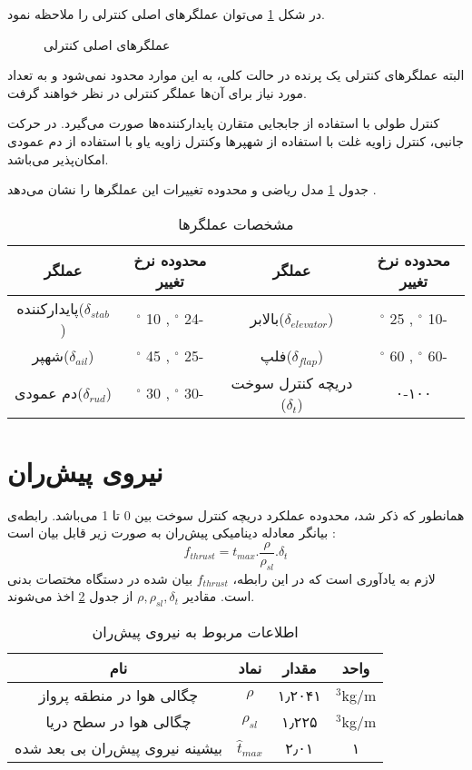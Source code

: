 در شکل \ref{pic:actuators} می‌توان عملگرهای اصلی کنترلی را ملاحظه نمود.
\begin{figure}[t]
\centering 
{}
\caption{عملگرهای اصلی کنترلی}
\label{pic:actuators} %
\end{figure}
البته عملگرهای کنترلی یک پرنده در حالت کلی، به این موارد محدود نمی‌شود و به تعداد مورد نیاز برای آن‌ها عملگر کنترلی در نظر خواهند گرفت.

کنترل طولی با استفاده از جابجایی متقارن پایدارکننده‌ها صورت می‌گیرد.
در حرکت جانبی، کنترل زاویه غلت با استفاده از شهپرها وکنترل زاویه یاو با استفاده از دم عمودی امکان‌پذیر می‌باشد.

جدول \ref{مشخصات عملگرها} مدل ریاضی و محدوده تغییرات این عملگرها را نشان می‌دهد
\cite{Khalighi2016xepersian}
.
\begin{table}
\centering%
\caption{مشخصات عملگرها}\label{مشخصات عملگرها}
\begin{tabular}{|c|c|c|c| }
  \hline  
  عملگر&محدوده نرخ تغییر& عملگر & محدوده نرخ تغییر\\
  \hline
  پایدارکننده($\delta_{stab}$)&$^{\circ}$ 10 , $^{\circ}$ 24-& بالابر($\delta_{elevator}$) &  $^{\circ}$ 25 , $^{\circ}$ 10-\\
  \hline
  شهپر($\delta_{ail}$)&$^{\circ}$ 45 , $^{\circ}$ 25- & فلپ($\delta_{flap}$) & $^{\circ}$ 60 , $^{\circ}$ 60- \\
  \hline
  دم عمودی($\delta_{rud}$)& $^{\circ}$ 30 , $^{\circ}$ 30- & دریچه کنترل سوخت ($\delta_t$)& ۰-۱۰۰\\
  \hline
\end{tabular}
\end{table}
\section{نیروی پیش‌ران }
همانطور که ذکر شد، محدوده عملکرد دریچه کنترل سوخت بین 0 تا 1 می‌باشد.
رابطه‌ی بیانگر معادله دینامیکی پیش‌ران به صورت زیر قابل بیان است
\cite{Khalighi2015xepersian}
:
\begin{equation}
f_{thrust}=t_{max}.\dfrac{\rho}{\rho_{sl}}.\delta_t
\end{equation}
لازم به یادآوری است که در این رابطه، $ f_{thrust} $ بیان شده در دستگاه مختصات بدنی است.
مقادیر
 $ \rho, \rho_{sl}, \delta_t $
 از جدول \ref{tab:thrust} اخذ می‌شوند.
\begin{table}
	\centering%
	\caption{اطلاعات مربوط به نیروی پیش‌ران}\label{tab:thrust}
	\begin{tabular}{ |c|c|c|c| }
		\hline
		نام  &  نماد & مقدار & واحد \\
		\hline
		چگالی هوا در منطقه پرواز  & $\rho$  & ۱٫۲۰۴۱ & $^3$kg/m \\
		\hline
		چگالی هوا در سطح دریا & $\rho_{sl}$ & ۱٫۲۲۵ & $^3$kg/m \\
		\hline
		بیشینه نیروی پیش‌ران بی بعد شده  & $\hat{t}_{max}$ & ۲٫۰۱ & ۱\\
		\hline
	\end{tabular}
\end{table}
